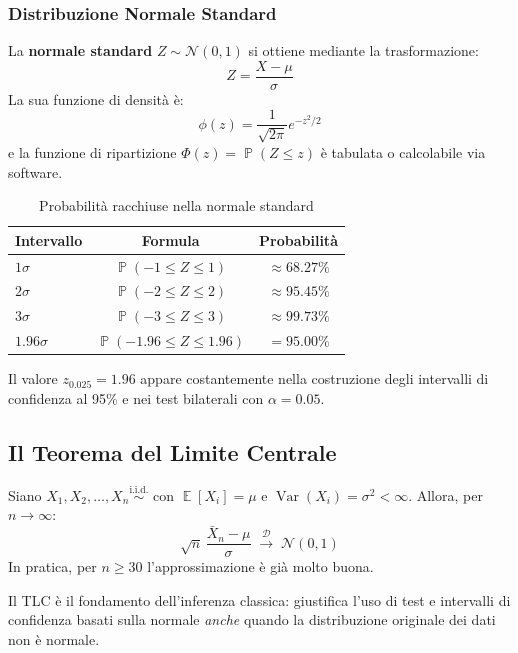 \documentclass[12pt, a4paper]{article}
\DeclareMathOperator{\Var}{Var}
\DeclareMathOperator{\E}{\mathbb{E}}
\DeclareMathOperator{\Prob}{\mathbb{P}}
\newcommand{\N}{\mathcal{N}}
\newcommand{\iid}{\overset{\text{i.i.d.}}{\sim}}
\begin{document}
\subsubsection{Distribuzione Normale Standard}

La \textbf{normale standard} $Z \sim \N(0,1)$ si ottiene mediante la
trasformazione:
\[
  Z = \frac{X - \mu}{\sigma}
\]
La sua funzione di densità è:
\[
  \phi(z) = \frac{1}{\sqrt{2\pi}} e^{-z^2/2}
\]
e la funzione di ripartizione $\Phi(z) = \Prob(Z \le z)$ è tabulata
o calcolabile via software.

\begin{table}[h!]
  \centering
  \caption{Probabilità racchiuse nella normale standard}
  \begin{tabular}{lcc}
    \toprule
    \textbf{Intervallo} & \textbf{Formula} & \textbf{Probabilità} \\
    \midrule
    $1\sigma$ & $\Prob(-1 \le Z \le 1)$ & $\approx 68.27\%$ \\
    $2\sigma$ & $\Prob(-2 \le Z \le 2)$ & $\approx 95.45\%$ \\
    $3\sigma$ & $\Prob(-3 \le Z \le 3)$ & $\approx 99.73\%$ \\
    $1.96\sigma$ & $\Prob(-1.96 \le Z \le 1.96)$ & $= 95.00\%$ \\
    \bottomrule
  \end{tabular}
\end{table}

\begin{nota}
  Il valore $z_{0.025} = 1.96$ appare costantemente nella costruzione degli
  intervalli di confidenza al 95\% e nei test bilaterali con $\alpha = 0.05$.
\end{nota}

\subsection{Il Teorema del Limite Centrale}
\label{sec:tlc}

\begin{teorema}
  Siano $X_1, X_2, \ldots, X_n \iid$ con $\E[X_i] = \mu$ e
  $\Var(X_i) = \sigma^2 < \infty$. Allora, per $n \to \infty$:
  \[
    \sqrt{n}\,\frac{\bar{X}_n - \mu}{\sigma}
    \;\xrightarrow{\;\mathcal{D}\;}\; \N(0,1)
  \]
  In pratica, per $n \ge 30$ l'approssimazione è già molto buona.
\end{teorema}

\begin{chiave}
  Il TLC è il fondamento dell'inferenza classica: giustifica l'uso di
  test e intervalli di confidenza basati sulla normale \emph{anche} quando
  la distribuzione originale dei dati non è normale.
\end{chiave}
\end{document}
